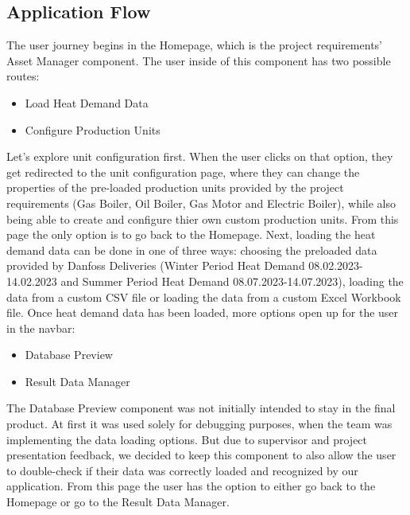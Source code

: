 \documentclass[12pt]{report}
\begin{document}
\subsection*{Application Flow}
\label{sec:appflow}
The user journey begins in the Homepage, which is the project requirements' Asset Manager component. The user inside of this component has two possible routes:
\begin{itemize}
  \item Load Heat Demand Data
  \item Configure Production Units
\end{itemize}
Let's explore unit configuration first. When the user clicks on that option, they get redirected to the unit configuration page, where they
can change the properties of the pre-loaded production units provided by the project requirements (Gas Boiler, Oil Boiler, Gas Motor and Electric Boiler), while
also being able to create and configure thier own custom production units. From this page the only option is to go back to the Homepage.
Next, loading the heat demand data can be done in one of three ways: choosing the preloaded data provided by Danfoss Deliveries 
(Winter Period Heat Demand 08.02.2023-14.02.2023 and Summer Period Heat Demand 08.07.2023-14.07.2023), loading the data from a custom CSV file or loading the data from a custom Excel Workbook file.
Once heat demand data has been loaded, more options open up for the user in the navbar:
\begin{itemize}
  \item Database Preview
  \item Result Data Manager
\end{itemize}
The Database Preview component was not initially intended to stay in the final product. At first it was used solely for debugging purposes, when 
the team was implementing the data loading options. But due to supervisor and project presentation feedback, we decided to keep this component
to also allow the user to double-check if their data was correctly loaded and recognized by our application. From this page the user has the option to either
go back to the Homepage or go to the Result Data Manager.
\end{document}
